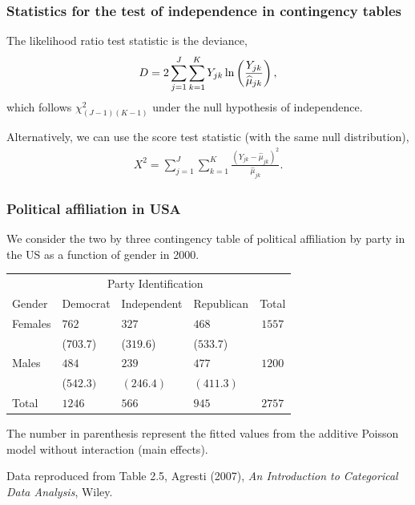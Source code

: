 \documentclass{beamer}
\begin{document}
\begin{frame}
\frametitle{Statistics for the test of independence in contingency tables}
\bi
 \item The likelihood ratio test statistic is the deviance, 
  \begin{align*}
   D= 2 \sum_{j=1}^J \sum_{k=1}^K Y_{jk}\ln \left(\frac{Y_{jk}}{\widehat{\mu}_{jk}}\right),
  \end{align*}
which follows $\chi^2_{(J-1)(K-1)}$ under the null hypothesis of independence.
\item Alternatively, we can use the score test statistic (with the same null distribution), 
\begin{align*}
 X^2 = \sum_{j=1}^J \sum_{k=1}^K \frac{(Y_{jk}-\hat{\mu}_{jk})^2}{\hat{\mu}_{jk}}.
\end{align*}
  \ei 
\end{frame}
\begin{frame}[fragile]
 \frametitle{Political affiliation in USA}
 We consider the two by three contingency table of political affiliation by party in the US as a function of gender in 2000.
 \begin{center}
 \begin{tabular}{llllc}
 \toprule 
  & \multicolumn{3}{c}{Party Identification} & \\
  \cmidrule(r){2-4}
  Gender & Democrat & Independent & Republican & Total\\
  Females & $762$ & $327$ & $468$ & $1557$ \\
   & ($703.7$) & ($319.6$) & ($533.7$) & \\
   Males & $484$ & $239$ & $477$ & $1200$ \\
    & ($542.3)$ & $(246.4)$ & $(411.3)$ & \\
    Total & $1246$ & $566$ & $945$ &$2757$\\
    \bottomrule 
    \end{tabular}
    \end{center}
    The number in parenthesis represent the fitted values from the additive Poisson model without interaction (main effects).

     
  {   \footnotesize
 Data reproduced from Table 2.5, Agresti (2007), \textsl{An Introduction to
Categorical Data Analysis}, Wiley.


}
\end{frame}
\end{document}

